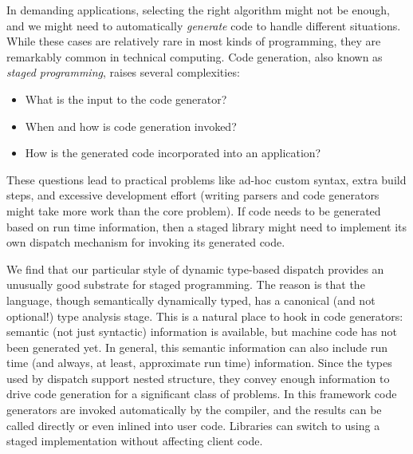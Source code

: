 In demanding applications, selecting the right algorithm might not
be enough, and we might need to automatically \emph{generate} code
to handle different situations.
While these cases are relatively rare in most kinds of programming,
they are remarkably common in technical computing.
Code generation, also known as \emph{staged programming}, raises
several complexities:

\vspace{-3ex}
\begin{singlespace}
\begin{itemize}
\item What is the input to the code generator?
\item When and how is code generation invoked?
\item How is the generated code incorporated into an application?
\end{itemize}
\end{singlespace}

\noindent
These questions lead to practical problems like ad-hoc custom syntax,
extra build steps, and excessive development effort (writing parsers and
code generators might take more work than the core problem).
If code needs to be generated based on run time information, then a
staged library might need to implement its own dispatch mechanism
for invoking its generated code.

We find that our particular style of dynamic type-based dispatch provides
an unusually good substrate for staged programming.
The reason is that the language, though semantically dynamically typed,
has a canonical (and not optional!) type analysis stage.
This is a natural place to hook in code generators: semantic (not just
syntactic) information is available, but machine code has not been
generated yet.
In general, this semantic information can also include run time (and
always, at least, approximate run time) information.
Since the types used by dispatch support nested structure, they
convey enough information to drive code generation for a significant
class of problems.
In this framework code generators are invoked automatically by
the compiler, and the results can be called directly or even inlined
into user code.
Libraries can switch to using a staged implementation without affecting
client code.



